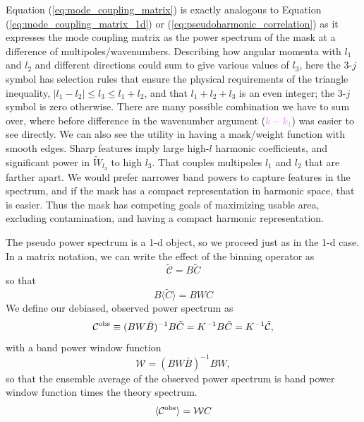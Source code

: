 Equation (\ref{eq:mode_coupling_matrix}) is exactly analogous to Equation (\ref{eq:mode_coupling_matrix_1d}) or (\ref{eq:pseudoharmonic_correlation}) as it expresses the mode coupling matrix as the power spectrum of the mask at a difference of multipoles/wavenumbers.  Describing how angular momenta with $l_1$ and $l_2$ and different directions could sum to give various values of $l_3$, here the 3-$j$ symbol has selection rules that ensure the physical requirements of the triangle inequality, $|l_1 - l_2| \leq l_3 \leq l_1+l_2$, and that $l_1 + l_2 + l_3$ is an even integer; the 3-$j$ symbol is zero otherwise.  There are many possible combination we have to sum over, where before difference in the wavenumber argument (\textcolor{violet}{$k-k_1$}) was easier to see directly.  We can also see the utility in having a mask/weight function with smooth edges.  Sharp features imply large high-$l$ harmonic coefficients, and significant power in $\tilde{W}_{l_3}$ to high $l_3$.  That couples multipoles $l_1$ and $l_2$ that are farther apart.  We would prefer narrower band powers to capture features in the spectrum, and if the mask has a compact representation in harmonic space, that is easier.  Thus the mask has competing goals of maximizing usable area, excluding contamination, and having a compact harmonic representation.

The pseudo power spectrum is a 1-d object, so we proceed just as in the 1-d case.  In a matrix notation, we can write the effect of the binning operator as
\begin{equation}
  \mathcal{\tilde C} = B\tilde C
\end{equation}
so that 
\begin{equation}
  B \langle \tilde C \rangle =  B W  C
\end{equation}
We define our debiased, observed power spectrum as
\begin{equation}
{\mathcal C^{\rm obs}} \equiv ( B W {\bar B})^{-1} B \tilde C = K^{-1} B \tilde C = K^{-1} \mathcal{\tilde C},
\end{equation}
with a band power window function 
\begin{equation}
  {\mathcal W} = (B W \bar B)^{-1} B W,
\end{equation}
so that the ensemble average of the observed power spectrum is band power window function times the theory spectrum. 
\begin{equation}
\langle {\mathcal C^{\rm obs}}  \rangle =  {\mathcal W} C
\end{equation}

